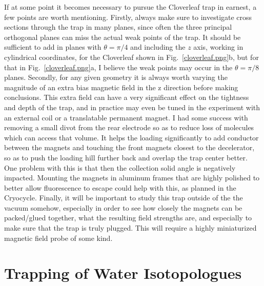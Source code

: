 
If at some point it becomes necessary to pursue the Cloverleaf trap in earnest, a few points are worth mentioning.
Firstly, always make sure to investigate cross sections through the trap in many planes, since often the three principal orthogonal planes can miss the actual weak points of the trap.
It should be sufficient to add in planes with $\theta=\pi/4$ and including the $z$ axis, working in cylindrical coordinates, for the Cloverleaf shown in Fig.~\ref{cloverleaf.png}b, but for that in Fig.~\ref{cloverleaf.png}a, I believe the weak points may occur in the $\theta=\pi/8$ planes.
Secondly, for any given geometry it is always worth varying the magnitude of an extra bias magnetic field in the z direction before making conclusions.
This extra field can have a very significant effect on the tightness and depth of the trap, and in practice may even be tuned in the experiment with an external coil or a translatable permanent magnet.
I had some success with removing a small divot from the rear electrode so as to reduce loss of molecules which can access that volume.
It helps the loading significantly to add conductor between the magnets and touching the front magnets closest to the decelerator, so as to push the loading hill further back and overlap the trap center better.
One problem with this is that then the collection solid angle is negatively impacted.
Mounting the magnets in aluminum frames that are highly polished to better allow fluorescence to escape could help with this, as planned in the Cryocycle.
Finally, it will be important to study this trap outside of the the vacuum somehow, especially in order to see how closely the magnets can be packed/glued together, what the resulting field strengths are, and especially to make sure that the trap is truly plugged.
This will require a highly miniaturized magnetic field probe of some kind.

\section{Trapping of Water Isotopologues}

